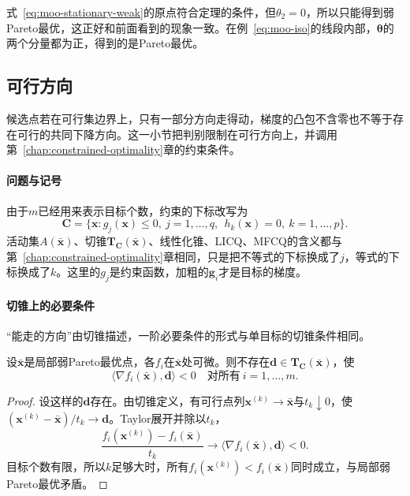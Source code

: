 式~\eqref{eq:moo-stationary-weak}的原点符合定理的条件，但$\theta_2=0$，所以只能得到弱Pareto最优，这正好和前面看到的现象一致。在例~\eqref{eq:moo-iso}的线段内部，$\bm{\theta}$的两个分量都为正，得到的是Pareto最优。

\subsection{可行方向}
\label{sec:moo-feasible-direction}

候选点若在可行集边界上，只有一部分方向走得动，梯度的凸包不含零也不等于存在可行的共同下降方向。这一小节把判别限制在可行方向上，并调用第~\ref{chap:constrained-optimality}章的约束条件。

\paragraph{问题与记号}
由于$m$已经用来表示目标个数，约束的下标改写为
\[
 \bm{C}=\{\bm{x}:g_j(\bm{x})\leq0,\ j=1,\ldots,q,\ \ h_k(\bm{x})=0,\ k=1,\ldots,p\}.
\]
活动集$A(\bar{\bm{x}})$、切锥$\bm{T}_{\bm{C}}(\bar{\bm{x}})$、线性化锥、LICQ、MFCQ的含义都与第~\ref{chap:constrained-optimality}章相同，只是把不等式的下标换成了$j$，等式的下标换成了$k$。这里的$g_j$是约束函数，加粗的$\bm{g}_i$才是目标的梯度。

\paragraph{切锥上的必要条件}
“能走的方向”由切锥描述，一阶必要条件的形式与单目标的切锥条件相同。

\begin{theorem}[切锥上的必要条件]
\label{thm:moo-tangent-necessary}
设$\bar{\bm{x}}$是局部弱Pareto最优点，各$f_i$在$\bar{\bm{x}}$处可微。则不存在$\bm{d}\in\bm{T}_{\bm{C}}(\bar{\bm{x}})$，使
\begin{equation}
 \langle\nabla f_i(\bar{\bm{x}}),\bm{d}\rangle<0\quad\text{对所有}\ i=1,\ldots,m.
 \label{eq:moo-tangent-descent}
\end{equation}
\end{theorem}

\begin{proof}
设这样的$\bm{d}$存在。由切锥定义，有可行点列$\bm{x}^{(k)}\to\bar{\bm{x}}$与$t_k\downarrow0$，使$(\bm{x}^{(k)}-\bar{\bm{x}})/t_k\to\bm{d}$。Taylor展开并除以$t_k$，
\[
 \frac{f_i(\bm{x}^{(k)})-f_i(\bar{\bm{x}})}{t_k}\to\langle\nabla f_i(\bar{\bm{x}}),\bm{d}\rangle<0.
\]
目标个数有限，所以$k$足够大时，所有$f_i(\bm{x}^{(k)})<f_i(\bar{\bm{x}})$同时成立，与局部弱Pareto最优矛盾。
\end{proof}

